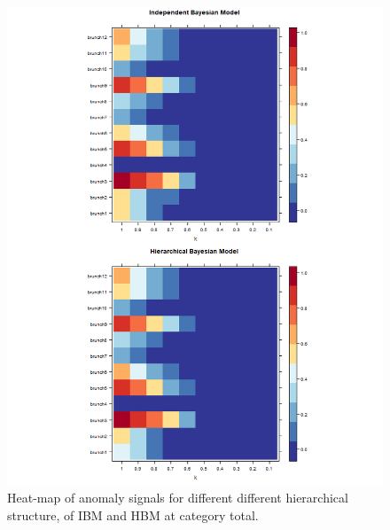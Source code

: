 		\begin{figure}[!h]
			\centering
			\includegraphics[width=1\linewidth]{../../R-codes/JAGS/plots/sim2/heattotal}
			\caption{Heat-map of anomaly signals for different different hierarchical structure, of IBM and HBM at category total.}
			\label{fig:heattotal3}
		\end{figure}
		
		\newpage
		
